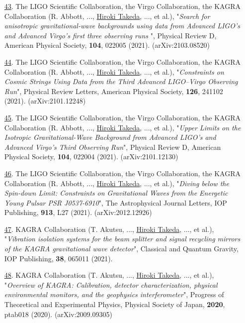 \documentclass[uplatex, 12pt]{article}
\begin{document}
\begin{enumerate}
\item[\uline{43}.] The LIGO Scientific Collaboration, the Virgo Collaboration, the KAGRA Collaboration (R. Abbott, ..., \uline{Hiroki Takeda}, ..., et al.), "\emph{Search for anisotropic gravitational-wave backgrounds using data from Advanced LIGO's and Advanced Virgo's first three observing runs }", Physical Review D, American Physical Society, {\bf 104}, 022005 (2021). (arXiv:2103.08520)\\

\item[\uline{44}.] The LIGO Scientific Collaboration, the Virgo Collaboration, the KAGRA Collaboration (R. Abbott, ..., \uline{Hiroki Takeda}, ..., et al.), "\emph{Constraints on Cosmic Strings Using Data from the Third Advanced LIGO–Virgo Observing Run}", Physical Review Letters, American Physical Society, {\bf 126}, 241102 (2021). (arXiv:2101.12248)\\

\item[\uline{45}.] The LIGO Scientific Collaboration, the Virgo Collaboration, the KAGRA Collaboration (R. Abbott, ..., \uline{Hiroki Takeda}, ..., et al.), "\emph{Upper Limits on the Isotropic Gravitational-Wave Background from Advanced LIGO's and Advanced Virgo's Third Observing Run}", Physical Review D, American Physical Society, {\bf 104}, 022004 (2021). (arXiv:2101.12130)\\

\item[\uline{46}.] The LIGO Scientific Collaboration, the Virgo Collaboration, the KAGRA Collaboration (R. Abbott, ..., \uline{Hiroki Takeda}, ..., et al.), "\emph{Diving below the Spin-down Limit: Constraints on Gravitational Waves from the Energetic Young Pulsar PSR J0537-6910}", The Astrophysical Journal Letters, IOP Publishing, {\bf 913}, L27 (2021). (arXiv:2012.12926)\\

\item[\uline{47}.] KAGRA Collaboration (T. Akutsu, ..., \uline{Hiroki Takeda}, ..., et al.),
"\emph{Vibration isolation systems for the beam splitter and signal recycling mirrors of the KAGRA gravitational wave detector}",
Classical and Quantum Gravity, IOP Publishing, {\bf 38}, 065011 (2021).\\

\item[\uline{48}.] KAGRA Collaboration (T. Akutsu, ..., \uline{Hiroki Takeda}, ..., et al.), "\emph{Overview of KAGRA: Calibration, detector characterization, physical environmental monitors, and the geophysics interferometer}", Progress of Theoretical and Experimental Physics, Physical Society of Japan, {\bf 2020}, ptab018 (2020). (arXiv:2009.09305)\\


\end{enumerate}
\end{document}
